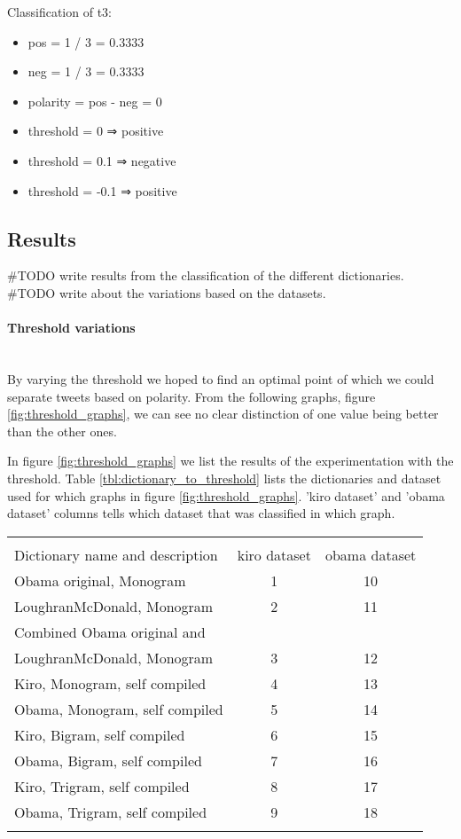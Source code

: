 Classification of t3:
\begin{itemize}
    \item pos = 1 / 3 = 0.3333
    \item neg = 1 / 3 = 0.3333
    \item polarity = pos - neg = 0
    \item threshold = 0 ⇒ positive
    \item threshold = 0.1 ⇒ negative
    \item threshold = -0.1 ⇒ positive
\end{itemize}

\subsection{Results}
#TODO write results from the classification of the different dictionaries. \\
#TODO write about the variations based on the datasets. \\

\paragraph{Threshold variations}
\hspace{0pt}\\
By varying the threshold we hoped to find an optimal point of which we could
separate tweets based on polarity. From the following
graphs, figure \ref{fig:threshold_graphs}, we can see no clear distinction of
one value being better than the other ones.  

In figure \ref{fig:threshold_graphs} we list the results of the experimentation
with the threshold. Table \ref{tbl:dictionary_to_threshold} lists the
dictionaries and dataset used for which graphs in figure \ref{fig:threshold_graphs}.
'kiro dataset' and 'obama dataset' columns tells which dataset that was
classified in which graph.

\begin{tabular}{ l c c }
\hspace{0pt}\\
Dictionary name and description & kiro dataset & obama dataset \\ 
Obama original, Monogram & 1 & 10 \\
LoughranMcDonald, Monogram & 2 & 11 \\
Combined Obama original and \\ LoughranMcDonald, Monogram & 3 & 12 \\
Kiro, Monogram, self compiled & 4 & 13 \\
Obama, Monogram, self compiled & 5 & 14 \\
Kiro, Bigram, self compiled & 6 & 15 \\
Obama, Bigram, self compiled & 7 & 16 \\
Kiro, Trigram, self compiled & 8 & 17 \\
Obama, Trigram, self compiled & 9 & 18 \\

\label{tbl:dictionary_to_threshold}
\end{tabular}

